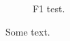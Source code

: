 \documentclass[11pt]{article}
\begin{document}
\begin{figure}[t]\centering\resizebox{\textwidth}{!}{}\caption{F1 test.}\end{figure}
Some text.
\end{document}
